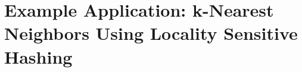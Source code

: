 \section{Example Application: k-Nearest Neighbors Using Locality Sensitive Hashing}

\cite{breyer_performance-portable_2021}
\cite{breyer_distributed_nodate}
\cite{breyer_hoch-performanter_nodate}

